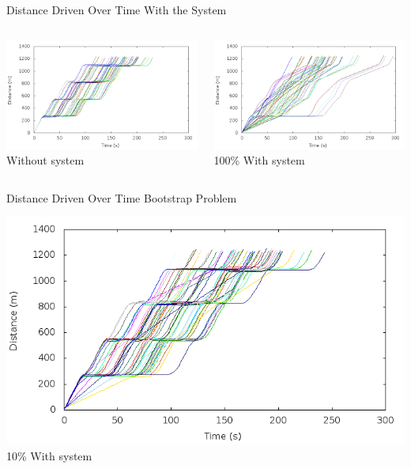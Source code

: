 	
\begin{frame}{Distance Driven Over Time With the System}
\begin{columns}
	\begin{column}{0.5\textwidth}
	\includegraphics[width=1\textwidth]{images/tp0/distance0.png}\\
	Without system
	\end{column}
	\begin{column}{0.5\textwidth}
	\includegraphics[width=1\textwidth]{images/tp0/distance100.png}\\
	100\% With system
	\end{column}
\end{columns}
\end{frame}


\begin{frame}{Distance Driven Over Time Bootstrap Problem}

\includegraphics[width=1\textwidth]{images/tp0/distance10.png}\\
10\% With system
\end{frame}


